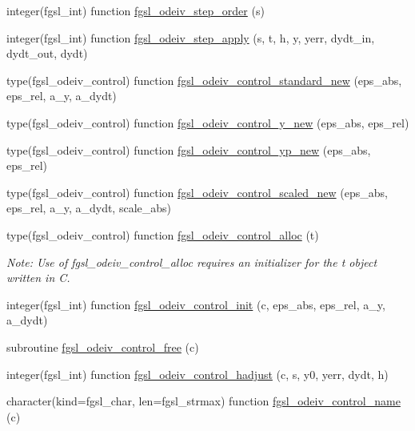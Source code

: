 \begin{DoxyCompactItemize}
\item 
integer(fgsl\+\_\+int) function \hyperlink{ode_8finc_ad473f673ac73701a32499c4f728c0ec0}{fgsl\+\_\+odeiv\+\_\+step\+\_\+order} (s)
\item 
integer(fgsl\+\_\+int) function \hyperlink{ode_8finc_a0447a8399777f24077e870ca2e3a2618}{fgsl\+\_\+odeiv\+\_\+step\+\_\+apply} (s, t, h, y, yerr, dydt\+\_\+in, dydt\+\_\+out, dydt)
\item 
type(fgsl\+\_\+odeiv\+\_\+control) function \hyperlink{ode_8finc_a8a7d90fb014f8aafeb3258a3edac66bf}{fgsl\+\_\+odeiv\+\_\+control\+\_\+standard\+\_\+new} (eps\+\_\+abs, eps\+\_\+rel, a\+\_\+y, a\+\_\+dydt)
\item 
type(fgsl\+\_\+odeiv\+\_\+control) function \hyperlink{ode_8finc_a1bf14333a561bcc24ac68aa26f69330d}{fgsl\+\_\+odeiv\+\_\+control\+\_\+y\+\_\+new} (eps\+\_\+abs, eps\+\_\+rel)
\item 
type(fgsl\+\_\+odeiv\+\_\+control) function \hyperlink{ode_8finc_a99432f111e5ae998c654c70d6c4196a7}{fgsl\+\_\+odeiv\+\_\+control\+\_\+yp\+\_\+new} (eps\+\_\+abs, eps\+\_\+rel)
\item 
type(fgsl\+\_\+odeiv\+\_\+control) function \hyperlink{ode_8finc_a200a70bf30d5b1501d944e74b30a9254}{fgsl\+\_\+odeiv\+\_\+control\+\_\+scaled\+\_\+new} (eps\+\_\+abs, eps\+\_\+rel, a\+\_\+y, a\+\_\+dydt, scale\+\_\+abs)
\item 
type(fgsl\+\_\+odeiv\+\_\+control) function \hyperlink{ode_8finc_aa135d17ea4a41614a6ac9789c11e220c}{fgsl\+\_\+odeiv\+\_\+control\+\_\+alloc} (t)
\begin{DoxyCompactList}\small\item\em Note\+: Use of fgsl\+\_\+odeiv\+\_\+control\+\_\+alloc requires an initializer for the t object written in C. \end{DoxyCompactList}\item 
integer(fgsl\+\_\+int) function \hyperlink{ode_8finc_a78a741026ae34107fa82e510868530b7}{fgsl\+\_\+odeiv\+\_\+control\+\_\+init} (c, eps\+\_\+abs, eps\+\_\+rel, a\+\_\+y, a\+\_\+dydt)
\item 
subroutine \hyperlink{ode_8finc_a8cc3184bf7c70b2ff108dea05763b452}{fgsl\+\_\+odeiv\+\_\+control\+\_\+free} (c)
\item 
integer(fgsl\+\_\+int) function \hyperlink{ode_8finc_a2792840e81747e88bf03c8ef0689699d}{fgsl\+\_\+odeiv\+\_\+control\+\_\+hadjust} (c, s, y0, yerr, dydt, h)
\item 
character(kind=fgsl\+\_\+char, len=fgsl\+\_\+strmax) function \hyperlink{ode_8finc_a1ff85c5d189557d6c94089dc1dd0bd99}{fgsl\+\_\+odeiv\+\_\+control\+\_\+name} (c)

\end{DoxyCompactItemize}
